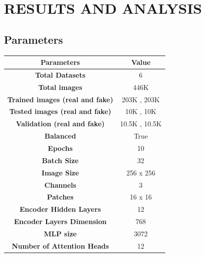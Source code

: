 \section{RESULTS AND ANALYSIS}
\subsection{Parameters}
\begin{table}[h]
    \centering
    \renewcommand{\arraystretch}{1.5} %
    \begin{tabular}{|c|c|}
        \hline
        \textbf{Parameters}                     & \textbf{Value}      \\
        \hline
        \textbf{Total Datasets}                 & 6                   \\
        \hline
        \textbf{Total images}                   & 446K                \\
        \hline
        \textbf{Trained images (real and fake)} & 203K , 203K         \\
        \hline
        \textbf{Tested images (real and fake)}  & 10K , 10K           \\
        \hline
        \textbf{Validation (real and fake)}     & 10.5K , 10.5K       \\
        \hline
        \textbf{Balanced}                       & True                \\
        \hline
        \textbf{Epochs}                         & 10                  \\
        \hline
        \textbf{Batch Size}                     & 32                  \\
        \hline
        \textbf{Image Size}                     & 256 x 256           \\
        \hline
        \textbf{Channels}                       & 3                   \\
        \hline
        \textbf{Patches}                        & 16 x 16             \\
        \hline
        \textbf{Encoder Hidden Layers}          & 12                  \\
        \hline
        \textbf{Encoder Layers Dimension}       & 768                 \\
        \hline
        \textbf{MLP size}                       & 3072                \\
        \hline
        \textbf{ Number of Attention Heads }    & 12                  \\

\end{tabular}
\end{table}
